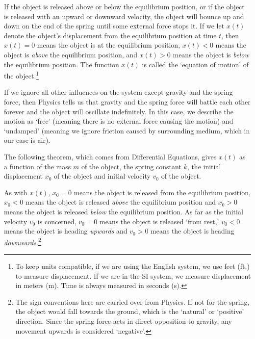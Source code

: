 \documentclass{ximera}
\begin{document}
If the object is released above or below the equilibrium position, or if the object is released with an upward or downward velocity, the object will bounce up and down on the end of the spring until some external force stops it.  If we let $x(t)$ denote the object's displacement from the equilibrium position at time $t$, then $x(t) = 0$ means the object is at the equilibrium position, $x(t) < 0$ means the object is \textit{above} the equilibrium position, and $x(t) > 0$ means the object is \textit{below} the equilibrium position.  The function $x(t)$ is called the `equation of motion' of the object.\footnote{To keep units compatible, if we are using the English system, we use feet (ft.) to measure displacement.  If we are in the SI system, we measure displacement in meters (m). Time is always measured in seconds (s).}

 


If we ignore all other influences on the system except gravity and the spring force, then Physics tells us that gravity and the spring force will battle each other forever and the object will oscillate indefinitely.  In this case, we describe the motion as `free' (meaning there is no external force causing the motion) and `undamped' (meaning we ignore friction caused by surrounding medium, which in our case is air).  

 

The following theorem, which comes from Differential Equations, gives $x(t)$ as a function of the mass $m$ of the object, the spring constant $k$, the initial displacement $x_0$ of the object and initial velocity $v_0$ of the object.  

 

As with $x(t)$, $x_0 = 0$ means the object is released from the equilibrium position, $x_0 < 0$ means the object is released \textit{above} the equilibrium position and $x_0>0$ means the object is released \textit{below} the equilibrium position.  As far as the initial velocity $v_0$ is concerned, $v_0 =0 $ means the object is released `from rest,' $v_0<0$ means the object is heading \textit{upwards} and $v_0>0$ means the object is heading \textit{downwards}.\footnote{The sign conventions here are carried over from Physics.  If not for the spring, the object would fall towards the ground, which is the `natural' or `positive' direction.  Since the spring force acts in direct opposition to gravity,  any movement upwards is considered `negative'.}

 
\end{document}
